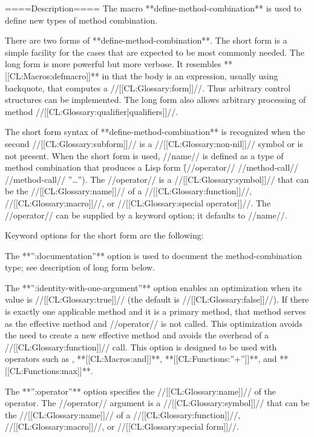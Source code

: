 ====Description====
The macro **define-method-combination** is used to define new types of method combination.

There are two forms of **define-method-combination**. The short form is a simple facility for the cases that are expected to be most commonly needed. The long form is more powerful but more verbose. It resembles **[[CL:Macros:defmacro]]** in that the body is an expression, usually using backquote, that computes a //[[CL:Glossary:form]]//. Thus arbitrary control structures can be implemented. The long form also allows arbitrary processing of method //[[CL:Glossary:qualifier|qualifiers]]//.

\beginlist {}

The short form syntax of **define-method-combination** is recognized when the second //[[CL:Glossary:subform]]// is a //[[CL:Glossary:non-nil]]// symbol or is not present. When the short form is used, //name// is defined as a type of method combination that produces a Lisp form \f{({//operator// //method-call// //method-call// ''\ldots''})}. The //operator// is a //[[CL:Glossary:symbol]]// that can be the //[[CL:Glossary:name]]// of a //[[CL:Glossary:function]]//, //[[CL:Glossary:macro]]//, or //[[CL:Glossary:special operator]]//. The //operator// can be supplied by a keyword option; it defaults to //name//.

Keyword options for the short form are the following:

\beginlist

\itemitem{\bull} The **'':documentation''** option is used to document the method-combination type; see description of long form below.

\itemitem{\bull} The **'':identity-with-one-argument''** option enables an optimization when its value is //[[CL:Glossary:true]]// (the default is //[[CL:Glossary:false]]//). If there is exactly one applicable method and it is a primary method, that method serves as the effective method and //operator// is not called. This optimization avoids the need to create a new effective method and avoids the overhead of a //[[CL:Glossary:function]]// call. This option is designed to be used with operators such as , **[[CL:Macros:and]]**, **[[CL:Functions:''+'']]**, and **[[CL:Functions:max]]**.

\itemitem{\bull} The **'':operator''** option specifies the //[[CL:Glossary:name]]// of the operator. The //operator// argument is a //[[CL:Glossary:symbol]]// that can be the //[[CL:Glossary:name]]// of a //[[CL:Glossary:function]]//, //[[CL:Glossary:macro]]//, or //[[CL:Glossary:special form]]//.


